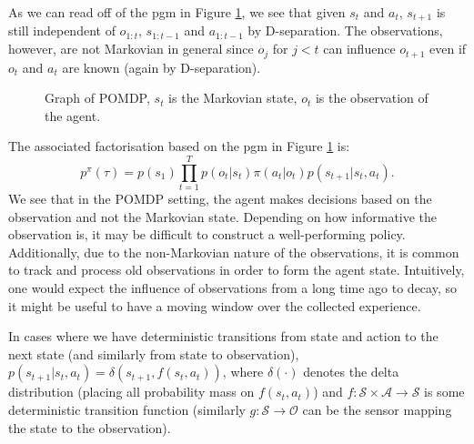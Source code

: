 \documentclass{report}
\numberwithin{equation}{section}
\numberwithin{figure}{section}
\numberwithin{table}{section}
\numberwithin{algorithm}{section}
\begin{document}
As we 
can read off of the pgm in Figure \ref{fig:POMDP}, we see that given 
$s_t$ and $a_t$, $s_{t+1}$ is still independent of 
$o_{1:t}$, $s_{1:t-1}$ and $a_{1:t-1}$ by D-separation.
The observations, however, are not Markovian in general 
since $o_j$ for $j<t$ 
can influence $o_{t+1}$ even if $o_t$ and $a_t$ are known (again by 
D-separation).

\begin{figure}[H]
  \centering
  \caption{\label{fig:POMDP} Graph of POMDP, $s_t$ is the Markovian 
  state, $o_t$ is the observation of the agent.}
\end{figure}

The associated factorisation based on the pgm in 
Figure \ref{fig:POMDP} is:
\begin{equation}
  p^{\pi}(\tau)=p(s_1)\prod_{t=1}^T p(o_t|s_t)\pi(a_t|o_t)p(s_{t+1}|s_t, a_t).
\end{equation}
We see that in the POMDP setting, the agent makes decisions based 
on the observation and not the Markovian state. Depending on how 
informative the observation is, it may be difficult to construct 
a well-performing policy. Additionally, due to the non-Markovian 
nature of the observations, it is common to track and process old 
observations in order to form the agent state. Intuitively, one 
would expect the influence of observations from a long time ago 
to decay, so it might be useful to have a moving window over the 
collected experience.

In cases where we have deterministic transitions from state and action 
to the next state (and similarly from state to observation), 
$p(s_{t+1}|s_t, a_t)=\delta(s_{t+1},f(s_t, a_t))$, where 
$\delta(\cdot)$ denotes the delta distribution (placing all 
probability mass on $f(s_t, a_t)$) and 
$f: \mathcal{S}\times\mathcal{A}\rightarrow \mathcal{S}$ is some deterministic 
transition function (similarly $g:\mathcal{S}\rightarrow \mathcal{O}$ 
can be the sensor mapping the state to the observation).
\end{document}
